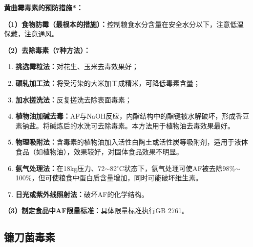 \begin{keybox}
\textbf{黄曲霉毒素的预防措施*：}

\textbf{（1）食物防霉（最根本的措施）：}控制粮食水分含量在安全水分以下，注意低温保藏，注意通风。

\textbf{（2）去除毒素（7种方法）：}
\begin{enumerate}[leftmargin=*]
    \item \textbf{挑选霉粒法：}对花生、玉米去毒效果好；
    \item \textbf{碾轧加工法：}将受污染的大米加工成精米，可降低毒素含量；
    \item \textbf{加水搓洗法：}反复搓洗去除表面毒素；
    \item \textbf{植物油加碱去毒：}AF与NaOH反应，内酯结构中的酯键被水解破坏，形成香豆素钠盐。将碱炼后的水洗可去除毒素。本方法用于植物油去毒效果最好。
    \item \textbf{物理吸附法：}含毒素的植物油加入活性白陶土或活性炭等吸附剂，适用于液体食品（如植物油），效果较好，对固体食品效果不明显。
    \item \textbf{氨气处理法：}在18kg压力、72$\sim$82$^\circ$C状态下，氨气处理可使AF被去除98\%$\sim$100\%，但可使粮食中蛋白质含量增加，同时可能破坏维生素。
    \item \textbf{日光或紫外线照射法：}破坏AF的化学结构。
\end{enumerate}

\textbf{（3）制定食品中AF限量标准：}具体限量标准执行GB 2761。
\end{keybox}

\subsection{镰刀菌毒素}

